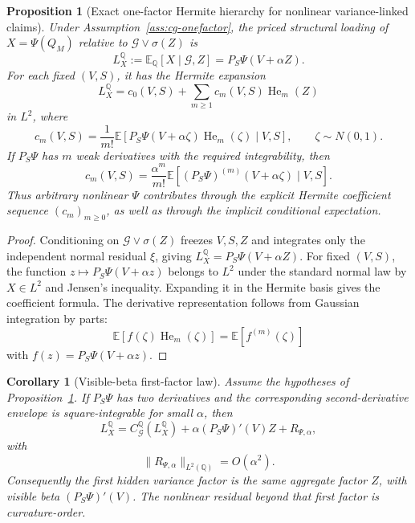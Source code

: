 \documentclass[11pt,a4paper]{amsart}
\theoremstyle{plain}
\newtheorem{proposition}[theorem]{Proposition}
\newtheorem{corollary}[theorem]{Corollary}
\theoremstyle{definition}
\theoremstyle{remark}
\DeclareMathOperator{\He}{He}
\newcommand{\QQ}{\mathbb{Q}}
\newcommand{\EE}{\mathbb{E}}
\newcommand{\cG}{\mathcal{G}}
\begin{document}
\begin{proposition}[Exact one-factor Hermite hierarchy for nonlinear variance-linked claims]\label{thm:nonlinear-hermite}
Under Assumption~\ref{ass:cg-onefactor}, the priced structural loading of
\(X=\Psi(Q_M)\) relative to \(\cG\vee\sigma(Z)\) is
\[
        L_X^\QQ
        :=
        \EE_\QQ[X\mid \cG,Z]
        =
        P_S\Psi(V+\alpha Z).
\]
For each fixed \((V,S)\), it has the Hermite expansion
\[
        L_X^\QQ
        =
        c_0(V,S)+\sum_{m\ge1}c_m(V,S)\He_m(Z)
\]
in \(L^2\), where
\[
        c_m(V,S)
        =
        \frac{1}{m!}
        \EE\!\left[
                P_S\Psi(V+\alpha\zeta)\He_m(\zeta)
                \mid V,S
        \right],
        \qquad
        \zeta\sim N(0,1).
\]
If \(P_S\Psi\) has \(m\) weak derivatives with the required integrability, then
\[
        c_m(V,S)
        =
        \frac{\alpha^m}{m!}
        \EE\!\left[
                (P_S\Psi)^{(m)}(V+\alpha\zeta)
                \mid V,S
        \right].
\]
Thus arbitrary nonlinear \(\Psi\) contributes through the explicit Hermite coefficient sequence
\((c_m)_{m\ge0}\), as well as through the implicit conditional expectation.
\end{proposition}

\begin{proof}
Conditioning on \(\cG\vee\sigma(Z)\) freezes \(V,S,Z\) and integrates only the independent normal
residual \(\xi\), giving \(L_X^\QQ=P_S\Psi(V+\alpha Z)\).  For fixed \((V,S)\), the function
\(z\mapsto P_S\Psi(V+\alpha z)\) belongs to \(L^2\) under the standard normal law by
\(X\in L^2\) and Jensen's inequality.  Expanding it in the Hermite basis gives the coefficient
formula.  The derivative representation follows from Gaussian integration by parts:
\[
        \EE[f(\zeta)\He_m(\zeta)]=\EE[f^{(m)}(\zeta)]
\]
with \(f(z)=P_S\Psi(V+\alpha z)\).
\end{proof}

\begin{corollary}[Visible-beta first-factor law]\label{cor:visible-beta-law}
Assume the hypotheses of Proposition~\ref{thm:nonlinear-hermite}.  If \(P_S\Psi\) has two derivatives
and the corresponding second-derivative envelope is square-integrable for small \(\alpha\), then
\[
        L_X^\QQ
        =
        C_\cG^\QQ(L_X^\QQ)
        +
        \alpha (P_S\Psi)'(V)Z
        +
        R_{\Psi,\alpha},
\]
with
\[
        \|R_{\Psi,\alpha}\|_{L^2(\QQ)}=O(\alpha^2).
\]
Consequently the first hidden variance factor is the same aggregate factor \(Z\), with visible beta
\((P_S\Psi)'(V)\).  The nonlinear residual beyond that first factor is curvature-order.
\end{corollary}
\end{document}
